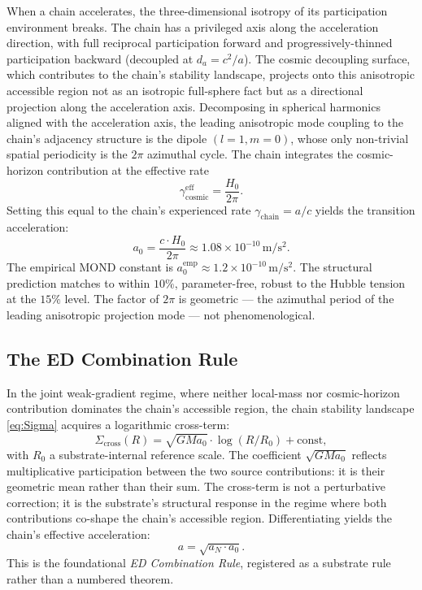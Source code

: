 \documentclass[11pt,a4paper]{article}
\begin{document}
When a chain accelerates, the three-dimensional isotropy of its participation environment breaks. The chain has a privileged axis along the acceleration direction, with full reciprocal participation forward and progressively-thinned participation backward (decoupled at $d_a = c^2/a$). The cosmic decoupling surface, which contributes to the chain's stability landscape, projects onto this anisotropic accessible region not as an isotropic full-sphere fact but as a directional projection along the acceleration axis. Decomposing in spherical harmonics aligned with the acceleration axis, the leading anisotropic mode coupling to the chain's adjacency structure is the dipole $(l = 1, m = 0)$, whose only non-trivial spatial periodicity is the $2\pi$ azimuthal cycle. The chain integrates the cosmic-horizon contribution at the effective rate
\begin{equation}
\gamma_\mathrm{cosmic}^\mathrm{eff} = \frac{H_0}{2\pi}.
\end{equation}
Setting this equal to the chain's experienced rate $\gamma_\mathrm{chain} = a/c$ yields the transition acceleration:
\begin{equation}
\boxed{\; a_0 = \frac{c \cdot H_0}{2\pi} \approx 1.08 \times 10^{-10}\,\mathrm{m/s^2}. \;}
\end{equation}
The empirical MOND constant is $a_0^\mathrm{emp} \approx 1.2 \times 10^{-10}\,\mathrm{m/s^2}$. The structural prediction matches to within $10\%$, parameter-free, robust to the Hubble tension at the $15\%$ level. The factor of $2\pi$ is geometric --- the azimuthal period of the leading anisotropic projection mode --- not phenomenological.

\subsection{The ED Combination Rule}

In the joint weak-gradient regime, where neither local-mass nor cosmic-horizon contribution dominates the chain's accessible region, the chain stability landscape \eqref{eq:Sigma} acquires a logarithmic cross-term:
\begin{equation}
\Sigma_\mathrm{cross}(R) = \sqrt{G M a_0} \cdot \log(R/R_0) + \mathrm{const},
\end{equation}
with $R_0$ a substrate-internal reference scale. The coefficient $\sqrt{G M a_0}$ reflects multiplicative participation between the two source contributions: it is their geometric mean rather than their sum. The cross-term is not a perturbative correction; it is the substrate's structural response in the regime where both contributions co-shape the chain's accessible region. Differentiating yields the chain's effective acceleration:
\begin{equation}
\boxed{\; a = \sqrt{a_N \cdot a_0}. \;}
\end{equation}
This is the foundational \emph{ED Combination Rule}, registered as a substrate rule rather than a numbered theorem.
\end{document}
